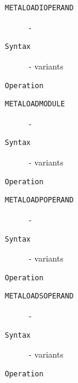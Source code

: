 \clearpage
\begin{description}
\item[\texttt{METALOADIOPERAND}]  - \\
\item[\texttt{Syntax}] - variants\\

\item[\texttt{Operation}]
\item[\texttt{}]
\end{description}
\clearpage
\begin{description}
\item[\texttt{METALOADMODULE}]  - \\
\item[\texttt{Syntax}] - variants\\

\item[\texttt{Operation}]
\item[\texttt{}]
\end{description}
\clearpage
\begin{description}
\item[\texttt{METALOADPOPERAND}]  - \\
\item[\texttt{Syntax}] - variants\\

\item[\texttt{Operation}]
\item[\texttt{}]
\end{description}
\clearpage
\begin{description}
\item[\texttt{METALOADSOPERAND}]  - \\
\item[\texttt{Syntax}] - variants\\

\item[\texttt{Operation}]
\item[\texttt{}]
\end{description}
